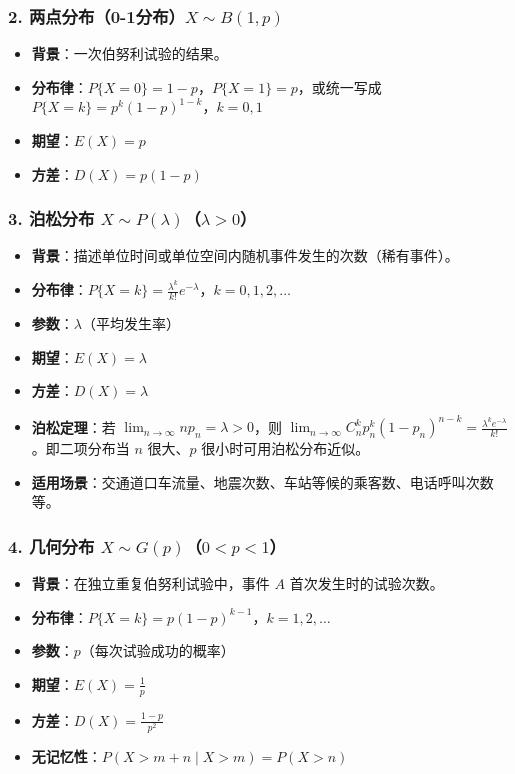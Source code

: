 \documentclass[12pt,a4paper]{ctexart}
\begin{document}
\subsubsection{2. 两点分布（0-1分布）$X \sim B(1, p)$}
\begin{itemize}[noitemsep]
    \item \textbf{背景}：一次伯努利试验的结果。
    \item \textbf{分布律}：$P\{X = 0\} = 1-p$，$P\{X = 1\} = p$，或统一写成 $P\{X = k\} = p^k (1-p)^{1-k}$，$k = 0,1$
    \item \textbf{期望}：$E(X) = p$
    \item \textbf{方差}：$D(X) = p(1-p)$
\end{itemize}

\subsubsection{3. 泊松分布 $X \sim P(\lambda)$（$\lambda > 0$）}
\begin{itemize}[noitemsep]
    \item \textbf{背景}：描述单位时间或单位空间内随机事件发生的次数（稀有事件）。
    \item \textbf{分布律}：$P\{X = k\} = \frac{\lambda^k}{k!} e^{-\lambda}$，$k = 0,1,2,\dots$
    \item \textbf{参数}：$\lambda$（平均发生率）
    \item \textbf{期望}：$E(X) = \lambda$
    \item \textbf{方差}：$D(X) = \lambda$
    \item \textbf{泊松定理}：若 $\lim_{n \to \infty} np_n = \lambda > 0$，则 $\lim_{n \to \infty} C_n^k p_n^k (1-p_n)^{n-k} = \frac{\lambda^k e^{-\lambda}}{k!}$。即二项分布当 $n$ 很大、$p$ 很小时可用泊松分布近似。
    \item \textbf{适用场景}：交通道口车流量、地震次数、车站等候的乘客数、电话呼叫次数等。
\end{itemize}

\subsubsection{4. 几何分布 $X \sim G(p)$（$0 < p < 1$）}
\begin{itemize}[noitemsep]
    \item \textbf{背景}：在独立重复伯努利试验中，事件 $A$ 首次发生时的试验次数。
    \item \textbf{分布律}：$P\{X = k\} = p(1-p)^{k-1}$，$k = 1,2,\dots$
    \item \textbf{参数}：$p$（每次试验成功的概率）
    \item \textbf{期望}：$E(X) = \frac{1}{p}$
    \item \textbf{方差}：$D(X) = \frac{1-p}{p^2}$
    \item \textbf{无记忆性}：$P(X > m+n \mid X > m) = P(X > n)$
\end{itemize}
\end{document}
